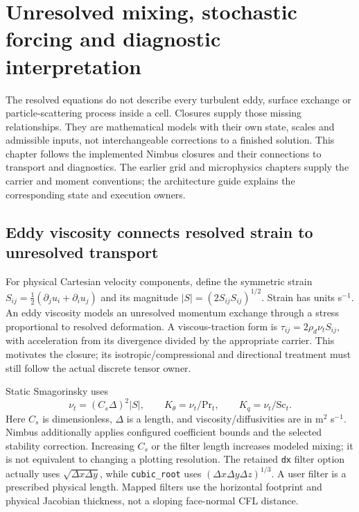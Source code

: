 \chapter{Unresolved mixing, stochastic forcing and diagnostic interpretation}
\label{mixing-theory}

The resolved equations do not describe every turbulent eddy, surface exchange
or particle-scattering process inside a cell. Closures supply those missing
relationships. They are mathematical models with their own state, scales and
admissible inputs, not interchangeable corrections to a finished solution.
This chapter follows the implemented Nimbus closures and their connections to
transport and diagnostics. The earlier grid and microphysics chapters supply
the carrier and moment conventions; the architecture guide explains the
corresponding state and execution owners.

\section{Eddy viscosity connects resolved strain to unresolved transport}

For physical Cartesian velocity components, define the symmetric strain
$S_{ij}=\tfrac12(\partial_j u_i+\partial_i u_j)$ and its magnitude
$|S|=(2S_{ij}S_{ij})^{1/2}$. Strain has units s$^{-1}$. An eddy viscosity
models an unresolved momentum exchange through a stress proportional to
resolved deformation. A viscous-traction form is $\tau_{ij}=2\rho_d\nu_tS_{ij}$,
with acceleration from its divergence divided by the appropriate carrier.
This motivates the closure; its isotropic/compressional and directional
treatment must still follow the actual discrete tensor owner.

Static Smagorinsky uses
\[
 \nu_t=(C_s\Delta)^2|S|,\qquad
 K_\theta=\nu_t/\mathrm{Pr}_t,\qquad
 K_q=\nu_t/\mathrm{Sc}_t.
\]
Here $C_s$ is dimensionless, $\Delta$ is a length, and viscosity/diffusivities
are in m$^2$ s$^{-1}$. Nimbus additionally applies configured coefficient
bounds and the selected stability correction. Increasing $C_s$ or the filter
length increases modeled mixing; it is not equivalent to changing a plotting
resolution. The retained \texttt{dx} filter option actually uses
$\sqrt{\Delta x\Delta y}$, while \texttt{cubic\_root} uses
$(\Delta x\Delta y\Delta z)^{1/3}$. A user filter is a prescribed physical
length. Mapped filters use the horizontal footprint and physical Jacobian
thickness, not a sloping face-normal CFL distance.

